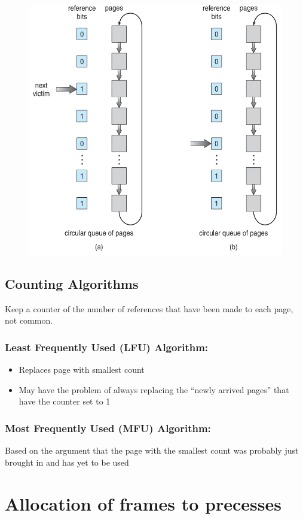 \begin{figure}[htbp]
    \centering
    \includegraphics[width=0.65\linewidth]{img/jnyfg.png}
\end{figure}

\subsection{Counting Algorithms}
Keep a counter of the number of references that have been made
to each page, not common.

\subsubsection{Least Frequently Used (LFU) Algorithm:}

\begin{itemize}
    \item Replaces page with smallest count
    \item May have the problem of always replacing the “newly arrived pages” that have the counter set to 1
\end{itemize}


\subsubsection{Most Frequently Used (MFU) Algorithm: }

Based on the argument that the page with the smallest count was probably just brought in and has yet to be used



\section{Allocation of frames to precesses}

